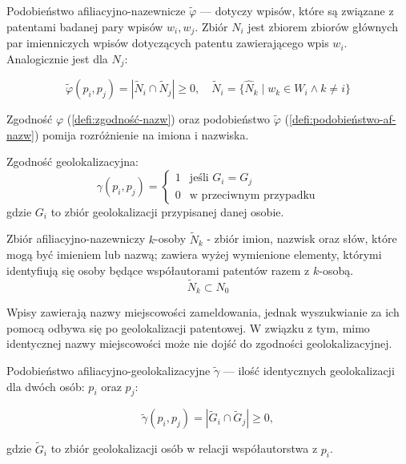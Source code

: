 \begin{defi}\label{defi:podobieństwo-af-nazw}
Podobieństwo afiliacyjno-nazewnicze $\tilde \varphi$ --- dotyczy wpisów,
które są związane z patentami badanej pary wpisów $w_i, w_j$.
Zbiór $N_i$ jest zbiorem zbiorów głównych par imienniczych wpisów
dotyczących patentu zawierającego wpis $w_i$. Analogicznie jest
dla $N_j$:

$$
\tilde \varphi(p_i, p_j) = | \tilde N_i \cap \tilde N_j | \ge 0,\quad
\tilde N_i = \{ \hat N_k \mid w_k \in W_i \land k \ne i \}
$$
\end{defi}

\begin{uwaga}
Zgodność $\varphi$ (\cref{defi:zgodność-nazw}) oraz podobieństwo $\tilde \varphi$ 
(\cref{defi:podobieństwo-af-nazw}) pomija rozróżnienie na imiona i nazwiska.
\end{uwaga}

\begin{defi}\label{defi:zgodność-geolokalizacyjna}
Zgodność geolokalizacyjna:
$$
\gamma(p_i, p_j) = \begin{cases}
  1 & \text{jeśli } G_i = G_j\\
  0 & \text{w przeciwnym przypadku}
\end{cases}
$$
gdzie $G_i$ to zbiór geolokalizacji przypisanej danej osobie.
\end{defi}

\begin{defi}
Zbiór afiliacyjno-nazewniczy $k$-osoby $\tilde N_k$ - zbiór imion, 
nazwisk oraz słów, które mogą być imieniem lub nazwą; zawiera
wyżej wymienione elementy, którymi identyfiują się osoby będące
współautorami patentów razem z $k$-osobą.
$$\tilde N_k \subset N_0$$
\end{defi}

\begin{uwaga}
Wpisy zawierają nazwy miejscowości zameldowania, jednak wyszukwianie za ich
pomocą odbywa się po geolokalizacji patentowej.
W związku z tym, mimo identycznej nazwy miejscowości może nie dojść do
zgodności geolokalizacyjnej.
\end{uwaga}

\begin{defi}\label{defi:podobieństwo-af-geo}
Podobieństwo afiliacyjno-geolokalizacyjne $\tilde\gamma$ --- ilość identycznych geolokalizacji
dla dwóch osób: $p_i$ oraz $p_j$:

$$
\tilde\gamma(p_i, p_j) = | \tilde G_i \cap \tilde G_j | \ge 0,
$$

gdzie $\tilde G_i$ to zbiór geolokalizacji osób w relacji współautorstwa z $p_i$.
\end{defi}

